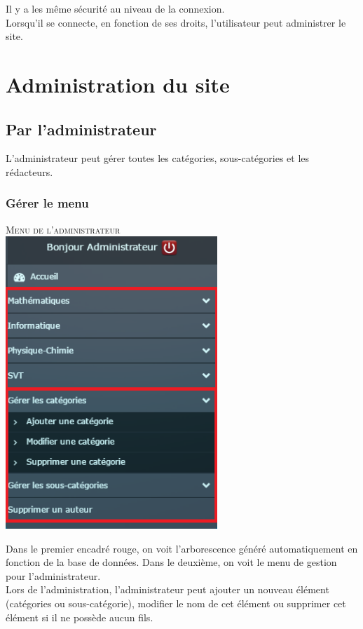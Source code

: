 \documentclass[hidelinks, 12pt,a4paper]{article}
\begin{document}
Il y a les même sécurité au niveau de la connexion.\\
Lorsqu'il se connecte, en fonction de ses droits, l'utilisateur peut administrer le site.

\newpage
\section{Administration du site}
\subsection{Par l'administrateur}
L'administrateur peut gérer toutes les catégories, sous-catégories et les rédacteurs. 

\subsubsection{Gérer le menu}
\begin{center}
\textsc{Menu de l'administrateur}\\
\includegraphics[width=8cm]{images/menu2.png}\\
\end{center}

Dans le premier encadré rouge, on voit l'arborescence généré automatiquement en fonction de la base de données. Dans le deuxième, on voit le menu de gestion pour l'administrateur.\\

Lors de l'administration, l'administrateur peut ajouter un nouveau élément (catégories ou sous-catégorie), modifier le nom de cet élément ou supprimer cet élément si il ne possède aucun fils.\\
\end{document}

